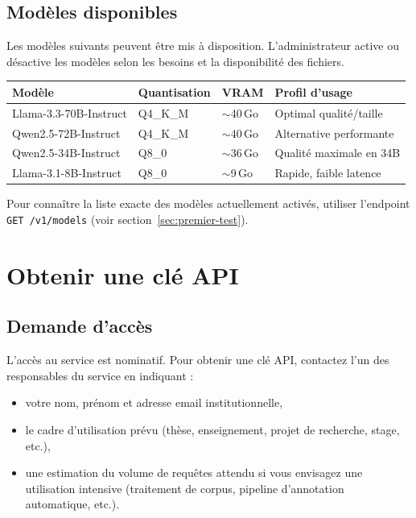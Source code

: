 \documentclass[12pt, a4paper, twoside]{article}
\newcommand{\api}[1]{\texttt{#1}}
\begin{document}
\subsection{Modèles disponibles}

Les modèles suivants peuvent être mis à disposition. L'administrateur active ou désactive les
modèles selon les besoins et la disponibilité des fichiers.

\begin{center}
\begin{tabular}{L{4.5cm} C{2.5cm} C{2cm} L{4.5cm}}
  \toprule
  \textbf{Modèle} & \textbf{Quantisation} & \textbf{VRAM} & \textbf{Profil d'usage} \\
  \midrule
  Llama-3.3-70B-Instruct  & Q4\_K\_M & $\sim$40\,Go & Optimal qualité/taille \\
  Qwen2.5-72B-Instruct    & Q4\_K\_M & $\sim$40\,Go & Alternative performante \\
  Qwen2.5-34B-Instruct    & Q8\_0    & $\sim$36\,Go & Qualité maximale en 34B \\
  Llama-3.1-8B-Instruct   & Q8\_0    & $\sim$9\,Go  & Rapide, faible latence \\
  \bottomrule
\end{tabular}
\end{center}

Pour connaître la liste exacte des modèles actuellement activés, utiliser l'endpoint
\api{GET /v1/models} (voir section~\ref{sec:premier-test}).

\section{Obtenir une clé API}
\label{sec:cle-api}

\subsection{Demande d'accès}

L'accès au service est nominatif. Pour obtenir une clé API, contactez l'un des responsables
du service en indiquant :
\begin{itemize}
  \item votre nom, prénom et adresse email institutionnelle,
  \item le cadre d'utilisation prévu (thèse, enseignement, projet de recherche, stage, etc.),
  \item une estimation du volume de requêtes attendu si vous envisagez une utilisation intensive
        (traitement de corpus, pipeline d'annotation automatique, etc.).
\end{itemize}
\end{document}
